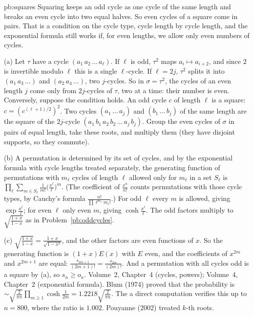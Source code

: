 \begin{solution}{pb:squares}
\idea Squaring keeps an odd cycle as one cycle of the same length and breaks an even cycle into two equal halves. So even
cycles of a square come in pairs. That is a condition on the cycle type, cycle length by cycle length, and the exponential
formula still works if, for even lengths, we allow only even numbers of cycles.

\writeup (a) Let $\tau$ have a cycle $(a_1\,a_2\,\dots\,a_\ell)$. If $\ell$ is odd, $\tau^2$ maps $a_i\mapsto a_{i+2}$, and since $2$ is
invertible modulo $\ell$ this is a single $\ell$-cycle. If $\ell=2j$, $\tau^2$ splits it into $(a_1\,a_3\,\dots)$ and
$(a_2\,a_4\,\dots)$, two $j$-cycles. So in $\sigma=\tau^2$, the cycles of an even length $j$ come only from $2j$-cycles of $\tau$,
two at a time: their number is even. Conversely, suppose the condition holds. An odd cycle $c$ of length $\ell$ is a square:
$c=(c^{(\ell+1)/2})^2$. Two cycles $(a_1\,\dots\,a_j)$ and $(b_1\,\dots\,b_j)$ of the same length are the square of the
$2j$-cycle $(a_1\,b_1\,a_2\,b_2\,\dots\,a_j\,b_j)$. Group the even cycles of $\sigma$ in pairs of equal length, take these roots,
and multiply them (they have disjoint supports, so they commute).

(b) A permutation is determined by its set of cycles, and by the exponential formula with cycle lengths treated separately,
the generating function of permutations with $m_\ell$ cycles of length $\ell$ allowed only for $m_\ell$ in a set $S_\ell$ is
$\prod_\ell\sum_{m\in S_\ell}\frac1{m!}\bigl(\frac{x^\ell}\ell\bigr)^m$. (The coefficient of $\frac{x^n}{n!}$ counts permutations with
those cycle types, by Cauchy's formula $\frac{n!}{\prod\ell^{m_\ell}m_\ell!}$.) For odd $\ell$ every $m$ is allowed, giving
$\exp\frac{x^\ell}\ell$; for even $\ell$ only even $m$, giving $\cosh\frac{x^\ell}\ell$. The odd factors multiply to $\sqrt{\frac{1+x}{1-x}}$
as in Problem~\ref{pb:oddcycles}.

(c) $\sqrt{\frac{1+x}{1-x}}=\frac{1+x}{\sqrt{1-x^2}}$, and the other factors are even functions of $x$. So the generating
function is $(1+x)E(x)$ with $E$ even, and the coefficients of $x^{2m}$ and $x^{2m+1}$ are equal: $\frac{s_{2m+1}}{(2m+1)!}=\frac{s_{2m}}{(2m)!}$.
And a permutation with all cycles odd is a square by (a), so $s_n\ge o_n$.
\tools Volume~2, Chapter~4 (cycles, powers); Volume~4, Chapter~2 (exponential formula).
\leads Blum (1974) proved that the probability is $\sim\sqrt{\frac2{\pi n}}\prod_{m\ge1}\cosh\frac1{2m}=1.2218\sqrt{\frac2{\pi n}}$. The
a direct computation verifies this up to $n=800$, where the ratio is $1.002$. Pouyanne (2002) treated $k$-th roots.
\end{solution}

